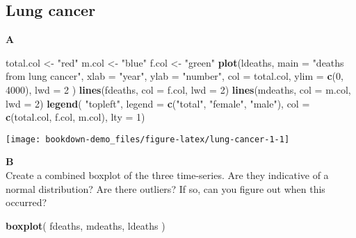 \documentclass[]{book}
\newenvironment{Shaded}{\begin{snugshade}}{\end{snugshade}}
\newcommand{\DataTypeTok}[1]{\textcolor[rgb]{0.13,0.29,0.53}{#1}}
\newcommand{\DecValTok}[1]{\textcolor[rgb]{0.00,0.00,0.81}{#1}}
\newcommand{\KeywordTok}[1]{\textcolor[rgb]{0.13,0.29,0.53}{\textbf{#1}}}
\newcommand{\NormalTok}[1]{#1}
\newcommand{\StringTok}[1]{\textcolor[rgb]{0.31,0.60,0.02}{#1}}
\begin{document}
\hypertarget{lung-cancer-1}{%
\subsection{Lung cancer}\label{lung-cancer-1}}

\textbf{A}

\begin{Shaded}
\begin{Highlighting}[]
\NormalTok{total.col <-}\StringTok{ "red"}
\NormalTok{m.col <-}\StringTok{ "blue"}
\NormalTok{f.col <-}\StringTok{ "green"}
\KeywordTok{plot}\NormalTok{(ldeaths,}
         \DataTypeTok{main =} \StringTok{"deaths from lung cancer"}\NormalTok{,}
         \DataTypeTok{xlab =} \StringTok{"year"}\NormalTok{,}
         \DataTypeTok{ylab =} \StringTok{"number"}\NormalTok{,}
         \DataTypeTok{col =}\NormalTok{ total.col,}
         \DataTypeTok{ylim =} \KeywordTok{c}\NormalTok{(}\DecValTok{0}\NormalTok{, }\DecValTok{4000}\NormalTok{),}
         \DataTypeTok{lwd =} \DecValTok{2}
\NormalTok{)}
\KeywordTok{lines}\NormalTok{(fdeaths, }\DataTypeTok{col =}\NormalTok{ f.col, }\DataTypeTok{lwd =} \DecValTok{2}\NormalTok{)}
\KeywordTok{lines}\NormalTok{(mdeaths, }\DataTypeTok{col =}\NormalTok{ m.col, }\DataTypeTok{lwd =} \DecValTok{2}\NormalTok{)}
\KeywordTok{legend}\NormalTok{(}
    \StringTok{"topleft"}\NormalTok{, }
    \DataTypeTok{legend =} \KeywordTok{c}\NormalTok{(}\StringTok{"total"}\NormalTok{, }\StringTok{"female"}\NormalTok{, }\StringTok{"male"}\NormalTok{), }
    \DataTypeTok{col =} \KeywordTok{c}\NormalTok{(total.col, f.col, m.col), }
    \DataTypeTok{lty =} \DecValTok{1}\NormalTok{)}
\end{Highlighting}
\end{Shaded}

\begin{center}\texttt{[image: bookdown-demo\_files/figure-latex/lung-cancer-1-1]} \end{center}

\textbf{B}\\
Create a combined boxplot of the three time-series. Are they indicative of a normal distribution? Are there outliers? If so, can you figure out when this occurred?

\begin{Shaded}
\begin{Highlighting}[]
\KeywordTok{boxplot}\NormalTok{(}
\NormalTok{    fdeaths, mdeaths, ldeaths}
\NormalTok{)}
\end{Highlighting}
\end{Shaded}
\end{document}
